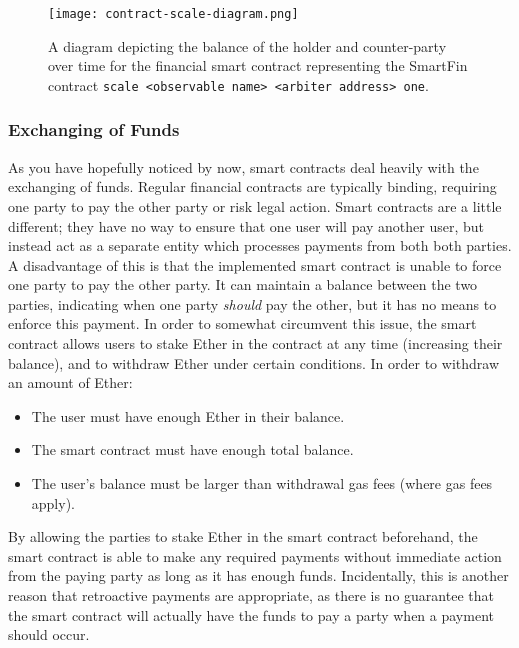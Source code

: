 \begin{figure}[h]
    \centering
    \texttt{[image: contract-scale-diagram.png]}
    \caption{A diagram depicting the balance of the holder and counter-party over time for the financial smart contract representing the SmartFin contract \texttt{scale <observable name> <arbiter address> one}.}
    \label{fig:contract-scale-update}
\end{figure}

\subsubsection{Exchanging of Funds}

As you have hopefully noticed by now, smart contracts deal heavily with the exchanging of funds. Regular financial contracts are typically binding, requiring one party to pay the other party or risk legal action. Smart contracts are a little different; they have no way to ensure that one user will pay another user, but instead act as a separate entity which processes payments from both both parties. \\

A disadvantage of this is that the implemented smart contract is unable to force one party to pay the other party. It can maintain a balance between the two parties, indicating when one party \textit{should} pay the other, but it has no means to enforce this payment. In order to somewhat circumvent this issue, the smart contract allows users to stake Ether in the contract at any time (increasing their balance), and to withdraw Ether under certain conditions. In order to withdraw an amount of Ether: \\

\begin{itemize}
    \item The user must have enough Ether in their balance.
    \item The smart contract must have enough total balance.
    \item The user's balance must be larger than withdrawal gas fees (where gas fees apply). \\
\end{itemize}

By allowing the parties to stake Ether in the smart contract beforehand, the smart contract is able to make any required payments without immediate action from the paying party as long as it has enough funds. Incidentally, this is another reason that retroactive payments are appropriate, as there is no guarantee that the smart contract will actually have the funds to pay a party when a payment should occur. \\

